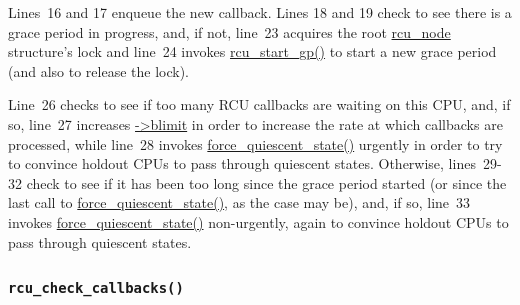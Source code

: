  \QuickQuizEnd

Lines~16 and 17 enqueue the new callback.
Lines 18 and 19 check to see there is a grace period in progress,
and, if not, line~23 acquires the root \url{rcu_node} structure's
lock and line~24 invokes \url{rcu_start_gp()} to start a new grace
period (and also to release the lock).

Line~26 checks to see if too many RCU callbacks are waiting on
this CPU, and, if so, line~27 increases \url{->blimit} in order
to increase the rate at which callbacks are processed, while
line~28 invokes \url{force_quiescent_state()} urgently in order to
try to convince holdout CPUs to pass through quiescent states.
Otherwise, lines~29-32 check to see if it has been too long since
the grace period started (or since the last call to
\url{force_quiescent_state()}, as the case may be), and, if so,
line~33 invokes \url{force_quiescent_state()} non-urgently, again
to convince holdout CPUs to pass through quiescent states.

\subsubsection{\tt rcu\_check\_callbacks()}
\label{app:rcuimpl:rcutreewt:rcu-check-callbacks}

